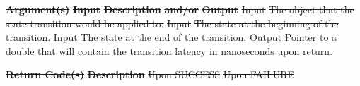 \documentclass[12pt]{report} %
\providecommand{\DIFdeltex}[1]{{\protect\color{red}\sout{#1}}}                      %
\providecommand{\DIFdel}[1]{\texorpdfstring{\DIFdeltex{#1}}{}} %
\begin{document}
\textbf{\DIFdel{Argument(s)}} %
\textbf{\DIFdel{Input}}  %
\textbf{\DIFdel{Description}} %
\textbf{\DIFdel{and/or}}     %
\textbf{\DIFdel{Output}} %
\DIFdel{Input }%
\DIFdel{The object that the state transition would be applied to.  }%
\DIFdel{Input }%
\DIFdel{The state at the beginning of the transition.  }%
\DIFdel{Input }%
\DIFdel{The state at the end of the transition. }%
\DIFdel{Output }%
\DIFdel{Pointer to a double that will contain the transition latency in nanoseconds upon return. }%

\textbf{\DIFdel{Return Code(s)}} %
\textbf{\DIFdel{Description}} %
\DIFdel{Upon SUCCESS }%
\DIFdel{Upon FAILURE }%

\end{document}
